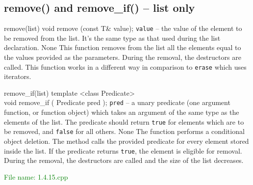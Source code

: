 
\subsection{remove() and remove\_if() – list only} %
\begin{methodinfo}
  {remove(list)}
  {void remove (const T& value);}
  {\texttt{value} – the value of the element to be removed from the list. It’s the same type as that 
  used during the list declaration.}
  {None}
  {This function removes from the list all the elements equal to the values provided as the parameters. 
  During the removal, the destructors are called. This function works in a different way in comparison 
  to \texttt{erase} which uses iterators.}
\end{methodinfo}

\begin{methodinfo}
  {remove_if(list)}
  {template <class Predicate>\\
     void remove_if ( Predicate pred );}
  {\texttt{pred} – a unary predicate (one argument function, or function object) which takes an 
  argument of the same type as the elements of the list. The predicate should return \texttt{true} 
  for elements which are to be removed, and \texttt{false} for all others.}
  {None}
  {The function  performs a conditional object deletion. 
  The method calls the provided predicate for every element stored inside the list. 
  If the predicate returns \texttt{true}, the element is eligible for removal. 
  During the removal, the destructors are called and the size of the list decreases.}
\end{methodinfo}

\textcolor{green}{File name: 1.4.15.cpp}

